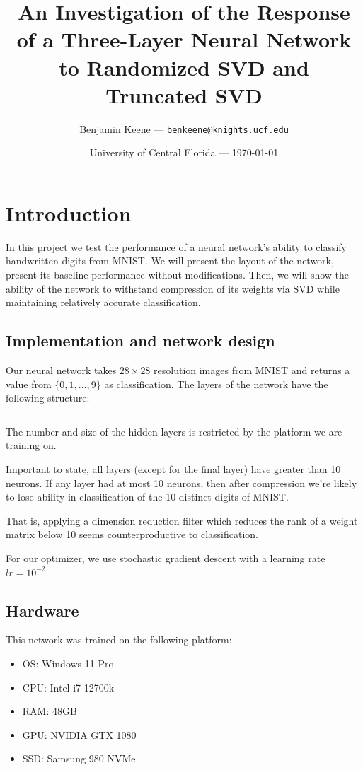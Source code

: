 \documentclass{article}
\title{An Investigation of the Response of a Three-Layer Neural Network to Randomized SVD and Truncated SVD} %
\author{Benjamin Keene --- \texttt{benkeene@knights.ucf.edu}} %
\date{University of Central Florida --- \today} %
\begin{document}
\maketitle %

{
	\tableofcontents
}

\section{Introduction}
In this project we test the performance of a neural network's ability to classify handwritten digits from MNIST.
We will present the layout of the network, present its baseline performance without modifications.
Then, we will show the ability of the network to withstand compression of its weights via SVD while maintaining relatively accurate classification.

\subsection{Implementation and network design}
Our neural network takes $28 \times 28$ resolution images from MNIST and returns a value from $\{0,1,...,9\}$ as classification.
The layers of the network have the following structure:

\inputminted{python}{snippets/struct.py}

The number and size of the hidden layers is restricted by the platform we are training on.

\bigskip

Important to state, all layers (except for the final layer) have greater than 10 neurons.
If any layer had at most 10 neurons, then after compression we're likely to lose ability in classification of the 10 distinct digits of MNIST.

That is, applying a dimension reduction filter which reduces the rank of a weight matrix below 10 seems counterproductive to classification.

\bigskip

For our optimizer, we use stochastic gradient descent with a learning rate $lr = 10^{-2}$.

\subsection{Hardware}

This network was trained on the following platform:
\begin{itemize}
	\item OS: Windows 11 Pro
	\item CPU: Intel i7-12700k
	\item RAM: 48GB
	\item GPU: NVIDIA GTX 1080
	\item SSD: Samsung 980 NVMe
\end{itemize}
\end{document}
